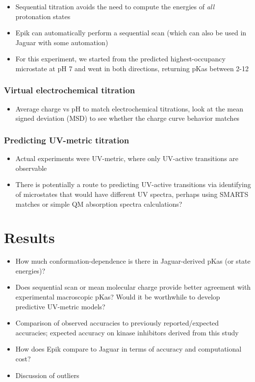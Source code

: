 \documentclass[9pt,lineno]{elife}
\begin{document}
\begin{itemize}
    \item Sequential titration avoids the need to compute the energies of \emph{all} protonation states
    \item Epik can automatically perform a sequential scan (which can also be used in Jaguar with some automation)
    \item For this experiment, we started from the predicted highest-occupancy microstate at pH 7 and went in both directions, returning pKas between 2-12
\end{itemize}

\subsubsection{Virtual electrochemical titration}
\begin{itemize}
    \item Average charge vs pH to match electrochemical titrations, look at the mean signed deviation (MSD) to see whether the charge curve behavior matches
\end{itemize}

\subsubsection{Predicting UV-metric titration}
\begin{itemize}
    \item Actual experiments were UV-metric, where only UV-active transitions are observable
    \item There is potentially a route to predicting UV-active transitions via identifying of microstates that would have different UV spectra, perhaps using SMARTS matches or simple QM absorption spectra calculations?
\end{itemize}

\section{Results}
\begin{itemize}
    \item How much conformation-dependence is there in Jaguar-derived pKas (or state energies)?
    \item Does sequential scan or mean molecular charge provide better agreement with experimental macroscopic pKas? Would it be worthwhile to develop predictive UV-metric models?
    \item Comparison of observed accuracies to previously reported/expected accuracies; expected accuracy on kinase inhibitors derived from this study
    \item How does Epik compare to Jaguar in terms of accuracy and computational cost?
    \item Discussion of outliers
\end{itemize}
\end{document}
